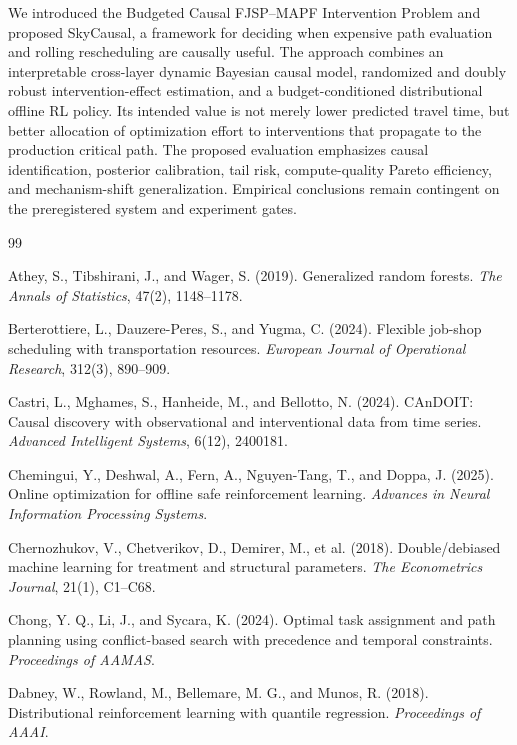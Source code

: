 \documentclass[11pt,a4paper]{article}
\newcommand{\method}{SkyCausal}
\begin{document}
We introduced the Budgeted Causal FJSP--MAPF Intervention Problem and proposed
\method, a framework for deciding when expensive path evaluation and rolling
rescheduling are causally useful. The approach combines an interpretable
cross-layer dynamic Bayesian causal model, randomized and doubly robust
intervention-effect estimation, and a budget-conditioned distributional offline
RL policy. Its intended value is not merely lower predicted travel time, but
better allocation of optimization effort to interventions that propagate to
the production critical path. The proposed evaluation emphasizes causal
identification, posterior calibration, tail risk, compute-quality Pareto
efficiency, and mechanism-shift generalization. Empirical conclusions remain
contingent on the preregistered system and experiment gates.

\begin{thebibliography}{99}

Athey, S., Tibshirani, J., and Wager, S. (2019).
Generalized random forests.
\emph{The Annals of Statistics}, 47(2), 1148--1178.

Berterottiere, L., Dauzere-Peres, S., and Yugma, C. (2024).
Flexible job-shop scheduling with transportation resources.
\emph{European Journal of Operational Research}, 312(3), 890--909.

Castri, L., Mghames, S., Hanheide, M., and Bellotto, N. (2024).
CAnDOIT: Causal discovery with observational and interventional data from time series.
\emph{Advanced Intelligent Systems}, 6(12), 2400181.

Chemingui, Y., Deshwal, A., Fern, A., Nguyen-Tang, T., and Doppa, J. (2025).
Online optimization for offline safe reinforcement learning.
\emph{Advances in Neural Information Processing Systems}.

Chernozhukov, V., Chetverikov, D., Demirer, M., et al. (2018).
Double/debiased machine learning for treatment and structural parameters.
\emph{The Econometrics Journal}, 21(1), C1--C68.

Chong, Y. Q., Li, J., and Sycara, K. (2024).
Optimal task assignment and path planning using conflict-based search with
precedence and temporal constraints.
\emph{Proceedings of AAMAS}.

Dabney, W., Rowland, M., Bellemare, M. G., and Munos, R. (2018).
Distributional reinforcement learning with quantile regression.
\emph{Proceedings of AAAI}.


\end{thebibliography}
\end{document}
